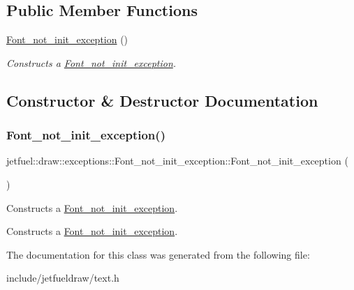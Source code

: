 \subsection*{Public Member Functions}
\begin{DoxyCompactItemize}
\item 
\hyperlink{classjetfuel_1_1draw_1_1exceptions_1_1Font__not__init__exception_af3e44125242cd74a0c2694abc15bec86}{Font\+\_\+not\+\_\+init\+\_\+exception} ()
\begin{DoxyCompactList}\small\item\em Constructs a \hyperlink{classjetfuel_1_1draw_1_1exceptions_1_1Font__not__init__exception}{Font\+\_\+not\+\_\+init\+\_\+exception}. \end{DoxyCompactList}\end{DoxyCompactItemize}


\subsection{Constructor \& Destructor Documentation}
\mbox{\label{classjetfuel_1_1draw_1_1exceptions_1_1Font__not__init__exception_af3e44125242cd74a0c2694abc15bec86}} 
\subsubsection{\texorpdfstring{Font\+\_\+not\+\_\+init\+\_\+exception()}{Font\_not\_init\_exception()}}
{\footnotesize\ttfamily jetfuel\+::draw\+::exceptions\+::\+Font\+\_\+not\+\_\+init\+\_\+exception\+::\+Font\+\_\+not\+\_\+init\+\_\+exception (\begin{DoxyParamCaption}{ }\end{DoxyParamCaption})\hspace{0.3cm}{\ttfamily [inline]}}



Constructs a \hyperlink{classjetfuel_1_1draw_1_1exceptions_1_1Font__not__init__exception}{Font\+\_\+not\+\_\+init\+\_\+exception}. 

Constructs a \hyperlink{classjetfuel_1_1draw_1_1exceptions_1_1Font__not__init__exception}{Font\+\_\+not\+\_\+init\+\_\+exception}. 

The documentation for this class was generated from the following file\+:\begin{DoxyCompactItemize}
\item 
include/jetfueldraw/text.\+h\end{DoxyCompactItemize}
